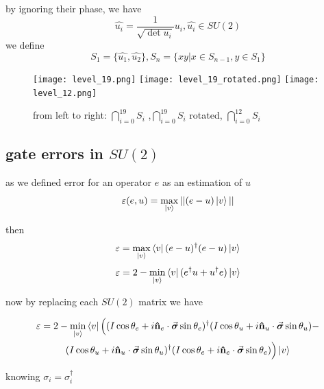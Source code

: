 \documentclass[11pt]{article}
\begin{document}
by ignoring their phase, we have
\[ \hat{u_i} = \frac{1}{\sqrt{\det u_i}} u_i, \hat{u_i} \in SU(2) \]
we define
\[ S_1 = \{\hat{u_1}, \hat{u_2}\}, S_n = \{x y | x \in S_{n-1}, y \in S_{1}\} \]

\begin{figure}[H]
\centering
\texttt{[image: level\_19.png]}
\texttt{[image: level\_19\_rotated.png]}
\texttt{[image: level\_12.png]}
\caption{from left to right: $\bigcap_{i=0}^{19} S_i$ ,\newline $\bigcap_{i=0}^{19} S_i$ rotated, $\bigcap_{i=0}^{12} S_i$  }
\end{figure}

\subsection{gate errors in $SU(2)$}

as we defined error for an operator $e$ as an estimation of $u$
\[ \varepsilon(e, u) = \max_{\ket{v}} || (e - u) \ket{v} || \]

then 
\[ \varepsilon = \max_{\ket{v}} \bra{v}(e - u)^\dagger (e - u) \ket{v} \]
\[ \varepsilon = 2 - \min_{\ket{v}} \bra{v} (e^\dagger u + u^\dagger e) \ket{v} \]

now by replacing each $SU(2)$ matrix we have

\begin{multline*}
\varepsilon = 2 - \min_{\ket{v}} 
\bra{v} \Big(
(I \cos\theta_e + i \vu{n}_e \cdot \va*{\sigma} \sin\theta_e)^\dagger
(I \cos\theta_u + i \vu{n}_u \cdot \va*{\sigma} \sin\theta_u) - \\
(I \cos\theta_u + i \vu{n}_u \cdot \va*{\sigma} \sin\theta_u)^\dagger
(I \cos\theta_e + i \vu{n}_e \cdot \va*{\sigma} \sin\theta_e)
\Big) \ket{v}
\end{multline*}

knowing $\sigma_i = \sigma_i^\dagger$
\end{document}
